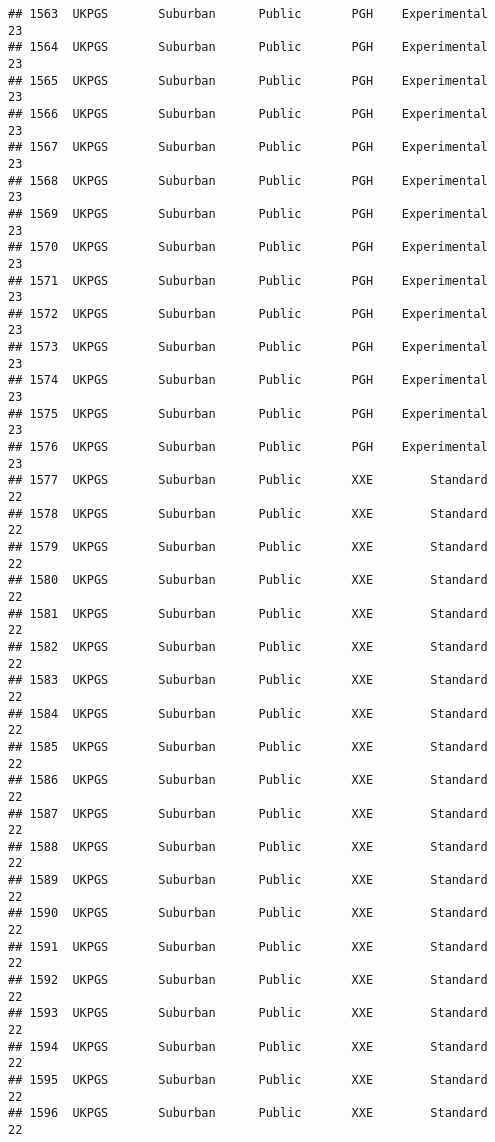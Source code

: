 \documentclass[
]{article}
\begin{document}
\begin{verbatim}
## 1563  UKPGS       Suburban      Public       PGH    Experimental        23
## 1564  UKPGS       Suburban      Public       PGH    Experimental        23
## 1565  UKPGS       Suburban      Public       PGH    Experimental        23
## 1566  UKPGS       Suburban      Public       PGH    Experimental        23
## 1567  UKPGS       Suburban      Public       PGH    Experimental        23
## 1568  UKPGS       Suburban      Public       PGH    Experimental        23
## 1569  UKPGS       Suburban      Public       PGH    Experimental        23
## 1570  UKPGS       Suburban      Public       PGH    Experimental        23
## 1571  UKPGS       Suburban      Public       PGH    Experimental        23
## 1572  UKPGS       Suburban      Public       PGH    Experimental        23
## 1573  UKPGS       Suburban      Public       PGH    Experimental        23
## 1574  UKPGS       Suburban      Public       PGH    Experimental        23
## 1575  UKPGS       Suburban      Public       PGH    Experimental        23
## 1576  UKPGS       Suburban      Public       PGH    Experimental        23
## 1577  UKPGS       Suburban      Public       XXE        Standard        22
## 1578  UKPGS       Suburban      Public       XXE        Standard        22
## 1579  UKPGS       Suburban      Public       XXE        Standard        22
## 1580  UKPGS       Suburban      Public       XXE        Standard        22
## 1581  UKPGS       Suburban      Public       XXE        Standard        22
## 1582  UKPGS       Suburban      Public       XXE        Standard        22
## 1583  UKPGS       Suburban      Public       XXE        Standard        22
## 1584  UKPGS       Suburban      Public       XXE        Standard        22
## 1585  UKPGS       Suburban      Public       XXE        Standard        22
## 1586  UKPGS       Suburban      Public       XXE        Standard        22
## 1587  UKPGS       Suburban      Public       XXE        Standard        22
## 1588  UKPGS       Suburban      Public       XXE        Standard        22
## 1589  UKPGS       Suburban      Public       XXE        Standard        22
## 1590  UKPGS       Suburban      Public       XXE        Standard        22
## 1591  UKPGS       Suburban      Public       XXE        Standard        22
## 1592  UKPGS       Suburban      Public       XXE        Standard        22
## 1593  UKPGS       Suburban      Public       XXE        Standard        22
## 1594  UKPGS       Suburban      Public       XXE        Standard        22
## 1595  UKPGS       Suburban      Public       XXE        Standard        22
## 1596  UKPGS       Suburban      Public       XXE        Standard        22

\end{verbatim}
\end{document}
